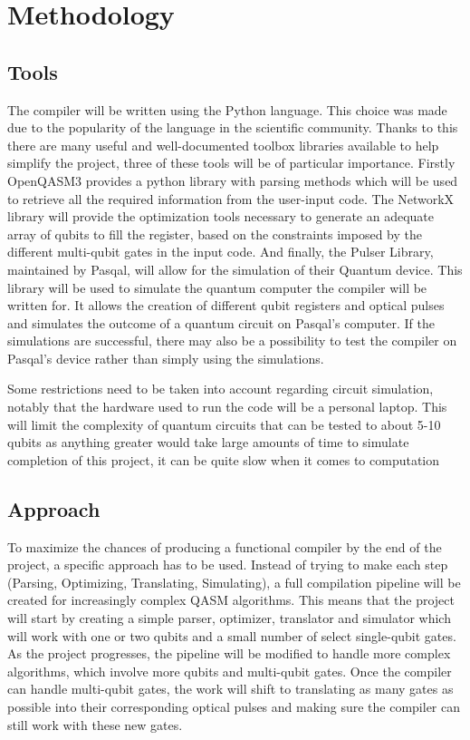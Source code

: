 \section{Methodology}
\label{sec:methods}

\subsection{Tools}
\label{sec:Tools}
The compiler will be written using the Python language. This choice was made due to the popularity of the language in 
the scientific community. Thanks to this there are many useful and well-documented toolbox libraries available to help simplify the project,
three of these tools will be of particular importance.
Firstly OpenQASM3 provides a python library with parsing methods which will be used to retrieve all the required information from the
user-input code. 
The NetworkX library will provide the optimization tools necessary to generate an adequate array 
of qubits to fill the register, based on the constraints imposed by the different multi-qubit gates in the input code.
And finally, the Pulser Library, maintained by Pasqal, will allow for the simulation of their Quantum device. 
This library will be used to simulate the quantum computer the compiler will be written for. It allows the creation of
different qubit registers and optical pulses and simulates the outcome of a quantum circuit on Pasqal's computer.
If the simulations are successful, there may also be a possibility to test the compiler on Pasqal's device rather than simply using the simulations.

Some restrictions need to be taken into account regarding circuit simulation, notably that the hardware used to run the code will be
 a personal laptop. This will limit the complexity of quantum circuits that can be tested to about 5-10 qubits as anything greater
 would take large amounts of time to simulate %
 completion of this project, it can be quite slow when it comes to computation %
\subsection{Approach}
\label{sec:Approach}
To maximize the chances of producing a functional compiler by the end of the project, a specific approach has to be used. Instead of
 trying to make each step (Parsing, Optimizing, Translating, Simulating), a full compilation pipeline will be created for increasingly complex 
 QASM algorithms. This means that the project will start by creating a simple parser, optimizer, translator and simulator which will work with
 one or two qubits and a small number of select single-qubit gates. As the project progresses, the pipeline will be modified to handle more complex algorithms, 
 which involve more qubits and multi-qubit gates. Once the compiler can handle multi-qubit gates, the work will shift to translating as many gates as possible 
 into their corresponding optical pulses and making sure the compiler can still work with these new gates.

